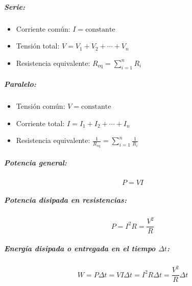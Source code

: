 \begin{tcolorbox}[resumen,title=Circuitos]
  \subparagraph{Serie:}
  \begin{itemize}
    \item Corriente común: \( I = \text{constante} \)
    \item Tensión total: \( V = V_1 + V_2 + \cdots + V_n \)
    \item Resistencia equivalente: \(R_{\text{eq}} = \sum_{i=1}^{n} R_i\)
  \end{itemize}
  
  \subparagraph{Paralelo:}
  \begin{itemize}
    \item Tensión común: \( V = \text{constante} \)
    \item Corriente total: \( I = I_1 + I_2 + \cdots + I_n \)
    \item Resistencia equivalente: \(\frac{1}{R_{\text{eq}}} = \sum_{i=1}^{n} \frac{1}{R_i}\)
  \end{itemize}
\end{tcolorbox}


\begin{tcolorbox}[resumen,title=Trabajo y Potencia eléctrica]
  \subparagraph{Potencia general:}  
  
  \[
    P = V I
  \]
  
  \subparagraph{Potencia disipada en resistencias:}  
  \[
    P = I^2 R = \frac{V^2}{R}
  \]
  
  \subparagraph{Energía disipada o entregada en el tiempo \( \Delta t \):}
  \[
    W = P \Delta t = V I \Delta t = I^2 R \Delta t = \frac{V^2}{R} \Delta t
  \]
\end{tcolorbox}
